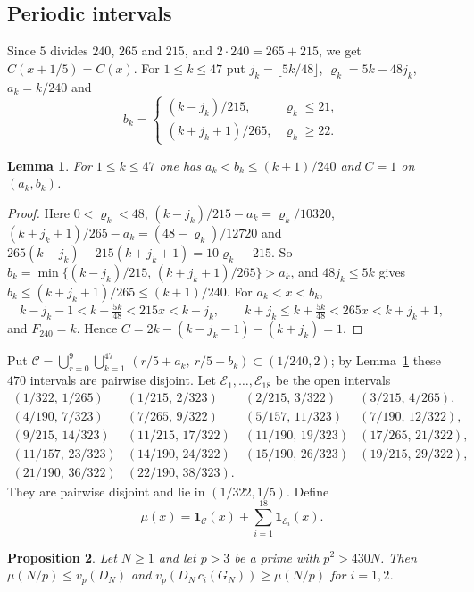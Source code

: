\documentclass{amsart}
\newtheorem{lemma}{Lemma}[section]
\newtheorem{proposition}[lemma]{Proposition}
\numberwithin{equation}{section}
\numberwithin{table}{section}
\newcommand{\fl}[1]{\lfloor #1\rfloor}
\begin{document}
\subsection{Periodic intervals}
Since $5$ divides $240$, $265$ and $215$, and $2\cdot240=265+215$, we get
$C(x+1/5)=C(x)$. For $1\le k\le47$ put $j_k=\fl{5k/48}$,
$\varrho_k=5k-48j_k$, $a_k=k/240$ and
\[
b_k=\begin{cases}(k-j_k)/215,&\varrho_k\le21,\\ (k+j_k+1)/265,&\varrho_k\ge22.\end{cases}
\]

\begin{lemma}\label{lem:band}
For $1\le k\le47$ one has $a_k<b_k\le(k+1)/240$ and $C=1$ on $(a_k,b_k)$.
\end{lemma}

\begin{proof}
Here $0<\varrho_k<48$, $(k-j_k)/215-a_k=\varrho_k/10320$,
$(k+j_k+1)/265-a_k=(48-\varrho_k)/12720$ and
$265(k-j_k)-215(k+j_k+1)=10\varrho_k-215$. So
$b_k=\min\{(k-j_k)/215,\,(k+j_k+1)/265\}>a_k$, and $48j_k\le5k$ gives
$b_k\le(k+j_k+1)/265\le(k+1)/240$. For $a_k<x<b_k$,
\[
k-j_k-1<k-\tfrac{5k}{48}<215x<k-j_k,\qquad
k+j_k\le k+\tfrac{5k}{48}<265x<k+j_k+1,
\]
and $F_{240}=k$. Hence $C=2k-(k-j_k-1)-(k+j_k)=1$.
\end{proof}

Put
$\mathcal C=\bigcup_{r=0}^{9}\bigcup_{k=1}^{47}\,(r/5+a_k,\ r/5+b_k)\subset(1/240,2)$;
by Lemma~\ref{lem:band} these $470$ intervals are pairwise disjoint. Let
$\mathcal E_1,\dots,\mathcal E_{18}$ be the open intervals
\[
\begin{array}{llll}
(1/322,\,1/265) & (1/215,\,2/323) & (2/215,\,3/322) & (3/215,\,4/265),\\
(4/190,\,7/323) & (7/265,\,9/322) & (5/157,\,11/323) & (7/190,\,12/322),\\
(9/215,\,14/323) & (11/215,\,17/322) & (11/190,\,19/323) & (17/265,\,21/322),\\
(11/157,\,23/323) & (14/190,\,24/322) & (15/190,\,26/323) & (19/215,\,29/322),\\
(21/190,\,36/322) & (22/190,\,38/323).
\end{array}
\]
They are pairwise disjoint and lie in $(1/322,1/5)$. Define
\[
\mu(x)=\mathbf 1_{\mathcal C}(x)+\sum_{i=1}^{18}\mathbf 1_{\mathcal E_i}(x).
\]

\begin{proposition}\label{prop:div}
Let $N\ge1$ and let $p>3$ be a prime with $p^2>430N$. Then
$\mu(N/p)\le v_p(D_N)$ and $v_p(D_N\,c_i(G_N))\ge\mu(N/p)$ for $i=1,2$.
\end{proposition}
\end{document}
